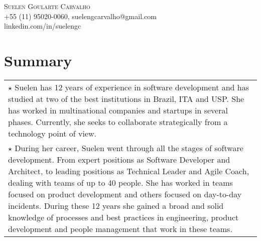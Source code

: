 \documentclass[a4paper, oneside, final]{scrartcl}
\newcommand{\vspc}{\vspace{0.15cm}} %
\begin{document}
\begin{center}
\textsc{\Huge{Suelen Goularte Carvalho}} \vspc\\
{\small +55 (11) 95020-0060, suelengcarvalho@gmail.com} \vspc\\
{\small linkedin.com/in/suelengc}






\section{Summary}
\begin{tabularx}{1\linewidth}{X}

$\star$ Suelen has 12 years of experience in software development and has studied at two of the best institutions in Brazil, ITA and USP. She has worked in multinational companies and startups in several phases. Currently, she seeks to collaborate strategically from a technology point of view. \vspc\\

$\star$ During her career, Suelen went through all the stages of software development. From expert positions as Software Developer and Architect, to leading positions as Technical Leader and Agile Coach, dealing with teams of up to 40 people. She has worked in teams focused on product development and others focused on day-to-day incidents. During these 12 years she gained a broad and solid knowledge of processes and best practices in engineering, product development and people management that work in these teams. \vspc\\


\end{tabularx}
\end{center}
\end{document}
